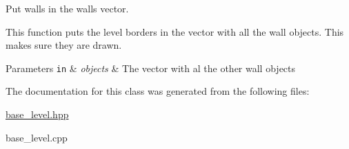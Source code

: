 Put walls in the walls vector. 

This function puts the level borders in the vector with all the wall objects. This makes sure they are drawn. 
\begin{DoxyParams}[1]{Parameters}
\mbox{\tt in}  & {\em objects} & The vector with al the other wall objects \\
\hline
\end{DoxyParams}


The documentation for this class was generated from the following files\+:\begin{DoxyCompactItemize}
\item 
\hyperlink{base__level_8hpp}{base\+\_\+level.\+hpp}\item 
base\+\_\+level.\+cpp\end{DoxyCompactItemize}
